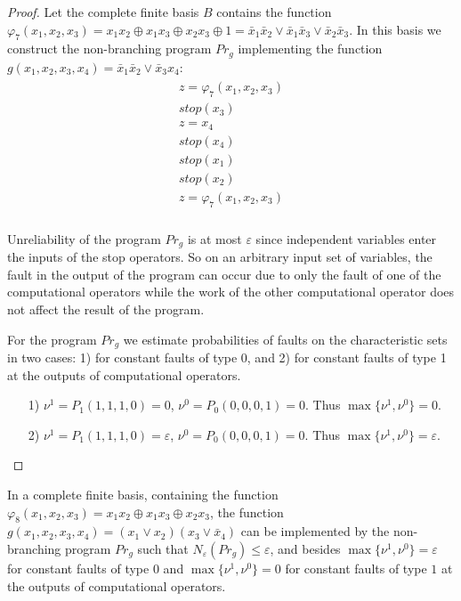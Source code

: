 \documentclass[
11pt,%
tightenlines,%
twoside,%
onecolumn,%
nofloats,%
nobibnotes,%
nofootinbib,%
superscriptaddress,%
noshowpacs,%
centertags]%
{revtex4}
\begin{document}
\begin{proof}
Let the complete finite basis $B$ contains the function
$\varphi_7(x_1, x_2, x_3)=x_1 x_2\oplus x_1 x_3 \oplus x_2 x_3
\oplus 1 =\bar{x}_1\bar{x}_2\vee \bar{x}_1\bar{x}_3\vee
\bar{x}_2\bar{x}_3$. In this basis we construct the non-branching
program $Pr_g$ implementing the function $g(x_1, x_2, x_3, x_4)=
\bar{x}_1\bar{x}_2 \vee \bar{x}_3 x_4$:
\begin{eqnarray*}
\begin{array}{l}
  z=\varphi_7(x_1, x_2, x_3) \\
  stop(x_3) \\
  z=x_4 \\
  stop(x_4) \\
  stop(x_1) \\
  stop(x_2) \\
  z=\varphi_7(x_1, x_2, x_3) \\
\end{array}
\end{eqnarray*}

Unreliability of the program $Pr_g$ is at most $\varepsilon$  since
independent variables enter the inputs of the stop operators. So on
an arbitrary input set of variables, the fault in the output of the
program can occur due to only the fault of one of the computational
operators while the work of the other computational operator does
not affect the result of the program.

For the program $Pr_g$ we estimate probabilities of faults on the
characteristic sets in two cases: 1) for constant faults of type 0,
and 2) for constant faults of type 1 at the outputs of computational
operators.
\begin{itemize}
\item[1)] $\nu^1=P_1(1, 1, 1, 0)=0$,  $\nu^0=P_0(0, 0, 0, 1)=0$. Thus $\max\{\nu^1, \nu^0\}=0$.
\item[2)] $\nu^1=P_1(1, 1, 1, 0)=\varepsilon$,  $\nu^0=P_0(0, 0, 0, 1)=0$. Thus $\max\{\nu^1, \nu^0\}=\varepsilon$.
\end{itemize}

\end{proof}

\begin{lemma}\label{l9}
In a complete finite basis, containing the function
$\varphi_8(x_1, x_2, x_3)=x_1 x_2\oplus x_1 x_3 \oplus x_2 x_3$, the function $g(x_1, x_2, x_3, x_4)= (x_1\vee x_2) (x_3 \vee \bar{x}_4)$ can be implemented by the non-branching program $Pr_g$ such that $N_\varepsilon(Pr_g)\leq \varepsilon$, and besides $\max\{\nu^1, \nu^0\}=\varepsilon$ for constant faults of type $0$ and $\max\{\nu^1, \nu^0\}=0$ for constant faults of type $1$ at the outputs of computational operators.
\end{lemma}
\end{document}
